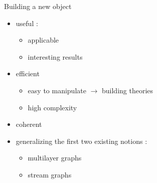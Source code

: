 \documentclass[15pt]{beamer}
\begin{document}
\begin{frame}{Building a new object}
	\begin{itemize}
		\item useful : \begin{itemize}
							\item applicable
							\item interesting results
						\end{itemize}		 \pause
		\item efficient \begin{itemize}
							\item easy to manipulate $\rightarrow$ building theories
							\item high complexity
						\end{itemize}\pause
		\item coherent \pause
		\item generalizing the first two existing notions : 
			\begin{itemize}
				\item multilayer graphs
				\item stream graphs
			\end{itemize}
	\end{itemize}
\end{frame}
\end{document}
